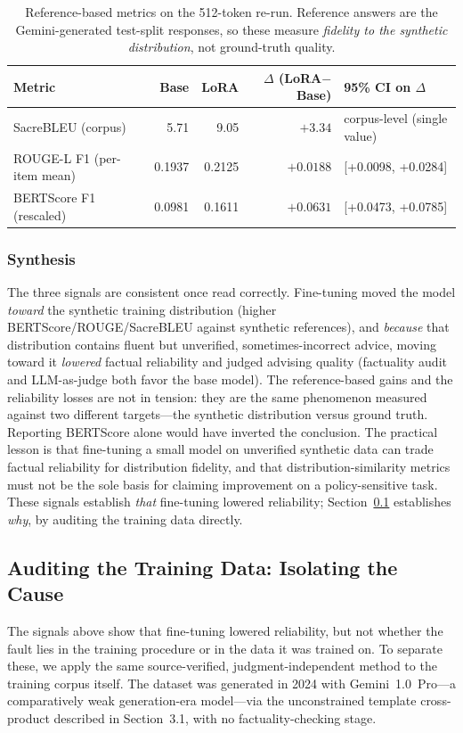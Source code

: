 \documentclass[11pt, a4paper]{article}
\begin{document}
\begin{table}[H]
\centering
\caption{Reference-based metrics on the 512-token re-run. Reference answers are the Gemini-generated test-split responses, so these measure \emph{fidelity to the synthetic distribution}, not ground-truth quality.}
\label{tab:std-metrics}
\begin{tabular}{lrrrl}
\hline
\textbf{Metric} & \textbf{Base} & \textbf{LoRA} & \textbf{$\Delta$ (LoRA$-$Base)} & \textbf{95\% CI on $\Delta$} \\
\hline
SacreBLEU (corpus)         & 5.71   & 9.05   & $+3.34$   & corpus-level (single value) \\
ROUGE-L F1 (per-item mean) & 0.1937 & 0.2125 & $+0.0188$ & [+0.0098, +0.0284] \\
BERTScore F1 (rescaled)    & 0.0981 & 0.1611 & $+0.0631$ & [+0.0473, +0.0785] \\
\hline
\end{tabular}
\end{table}

\subsubsection{Synthesis}
The three signals are consistent once read correctly. Fine-tuning moved the model \emph{toward} the synthetic training distribution (higher BERTScore/ROUGE/SacreBLEU against synthetic references), and \emph{because} that distribution contains fluent but unverified, sometimes-incorrect advice, moving toward it \emph{lowered} factual reliability and judged advising quality (factuality audit and LLM-as-judge both favor the base model). The reference-based gains and the reliability losses are not in tension: they are the same phenomenon measured against two different targets---the synthetic distribution versus ground truth. Reporting BERTScore alone would have inverted the conclusion. The practical lesson is that fine-tuning a small model on unverified synthetic data can trade factual reliability for distribution fidelity, and that distribution-similarity metrics must not be the sole basis for claiming improvement on a policy-sensitive task. These signals establish \emph{that} fine-tuning lowered reliability; Section~\ref{sec:dataaudit} establishes \emph{why}, by auditing the training data directly.

\subsection{Auditing the Training Data: Isolating the Cause}
\label{sec:dataaudit}
The signals above show that fine-tuning lowered reliability, but not whether the fault lies in the training procedure or in the data it was trained on. To separate these, we apply the same source-verified, judgment-independent method to the training corpus itself. The dataset was generated in 2024 with Gemini~1.0~Pro---a comparatively weak generation-era model---via the unconstrained template cross-product described in Section~3.1, with no factuality-checking stage.
\end{document}
